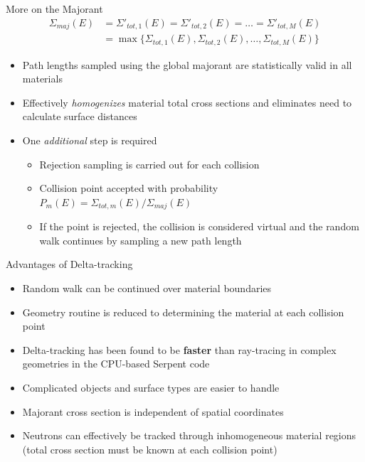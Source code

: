 \documentclass[xcolor=x11names, compress]{beamer}
\renewcommand{\(}{\begin{columns}}
\renewcommand{\)}{\end{columns}}
\newcommand{\<}[1]{\begin{column}{#1}}
\renewcommand{\>}{\end{column}}
\begin{document}
\begin{frame}{More on the Majorant \cite{serpent}}
	\begin{equation*}
        \begin{aligned}
        \Sigma_{maj}(E) &= \Sigma'_{tot,1}(E) = \Sigma'_{tot,2}(E) = \ldots = \Sigma'_{tot,M}(E) \\
        & = \max\{\Sigma_{tot,1}(E), \Sigma_{tot,2}(E),\ldots, \Sigma_{tot,M}(E)\}
        \end{aligned}
        \end{equation*}
	\begin{itemize}
	\item{Path lengths sampled using the global majorant are statistically valid in all materials}
	\item{Effectively \textit{homogenizes} material total cross sections and eliminates need to calculate 
	surface distances}
	\pause
	\item{One \textit{additional} step is required}
		\begin{itemize}
		\pause
		\item{Rejection sampling is carried out for each collision}
		\item{Collision point accepted with probability 
		$P_{m}(E) = \Sigma_{tot,m}(E)/\Sigma_{maj}(E)$}
		\item{If the point is rejected, the collision is considered virtual and the random walk 
		continues by sampling a new path length}
		\end{itemize}
	\end{itemize}
\end{frame}


\begin{frame}{Advantages of Delta-tracking \cite{serpent}}
	\begin{itemize}
	\item{Random walk can be continued over material boundaries}
	\pause
	\item{Geometry routine is reduced to determining the material at each collision point}
	\pause
	\item{Delta-tracking has been found to be \textbf{faster} than ray-tracing in complex geometries in the 
	CPU-based Serpent code}
	\pause
	\item{Complicated objects and surface types are easier to handle}
	\pause
	\item{Majorant cross section is independent of spatial coordinates}
	\pause
	\item{Neutrons can effectively be tracked through inhomogeneous material regions (total cross section must be known at each collision point)}
	\end{itemize}
\end{frame}
\end{document}
